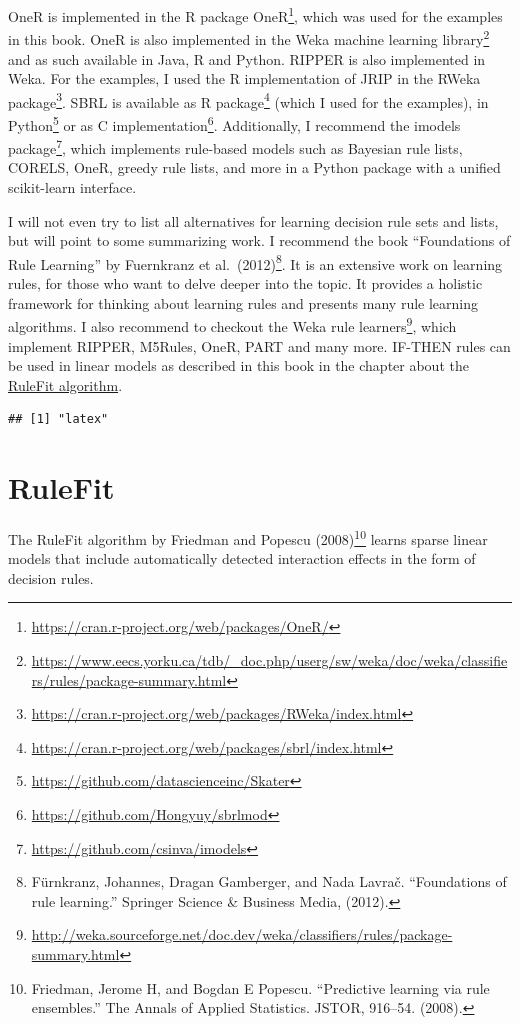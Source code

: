 \documentclass[
  11pt,
]{scrbook}
\renewcommand{\href}[2]{#2\footnote{\url{#1}}}
\begin{document}
OneR is implemented in the \href{https://cran.r-project.org/web/packages/OneR/}{R package OneR}, which was used for the examples in this book.
OneR is also implemented in the \href{https://www.eecs.yorku.ca/tdb/_doc.php/userg/sw/weka/doc/weka/classifiers/rules/package-summary.html}{Weka machine learning library} and as such available in Java, R and Python.
RIPPER is also implemented in Weka. For the examples, I used the R implementation of JRIP in the \href{https://cran.r-project.org/web/packages/RWeka/index.html}{RWeka package}.
SBRL is available as \href{https://cran.r-project.org/web/packages/sbrl/index.html}{R package} (which I used for the examples), in \href{https://github.com/datascienceinc/Skater}{Python} or as \href{https://github.com/Hongyuy/sbrlmod}{C implementation}.
Additionally, I recommend the \href{https://github.com/csinva/imodels}{imodels package}, which implements rule-based models such as Bayesian rule lists, CORELS, OneR, greedy rule lists, and more in a Python package with a unified scikit-learn interface.

I will not even try to list all alternatives for learning decision rule sets and lists, but will point to some summarizing work.
I recommend the book ``Foundations of Rule Learning'' by Fuernkranz et al.~(2012)\footnote{Fürnkranz, Johannes, Dragan Gamberger, and Nada Lavrač. ``Foundations of rule learning.'' Springer Science \& Business Media, (2012).}.
It is an extensive work on learning rules, for those who want to delve deeper into the topic.
It provides a holistic framework for thinking about learning rules and presents many rule learning algorithms.
I also recommend to checkout the \href{http://weka.sourceforge.net/doc.dev/weka/classifiers/rules/package-summary.html}{Weka rule learners}, which implement RIPPER, M5Rules, OneR, PART and many more.
IF-THEN rules can be used in linear models as described in this book in the chapter about the \protect\hyperlink{rulefit}{RuleFit algorithm}.

\begin{verbatim}
## [1] "latex"
\end{verbatim}

\newpage

\hypertarget{rulefit}{%
\section{RuleFit}\label{rulefit}}

The RuleFit algorithm by Friedman and Popescu (2008)\footnote{Friedman, Jerome H, and Bogdan E Popescu. ``Predictive learning via rule ensembles.'' The Annals of Applied Statistics. JSTOR, 916--54. (2008).} learns sparse linear models that include automatically detected interaction effects in the form of decision rules.
\end{document}
